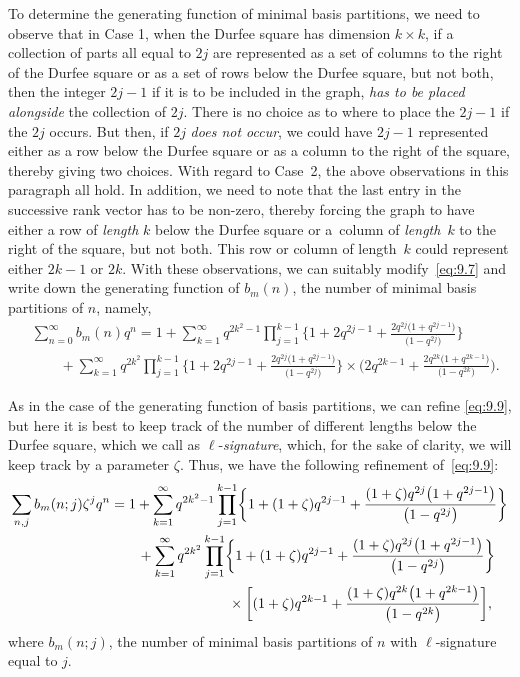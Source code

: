 \documentclass[pdftex]{sigma}
\numberwithin{equation}{section}
\theoremstyle{definition}
\begin{document}
To determine the generating function of minimal basis partitions, we need
to observe that in Case 1, when the Durfee square has dimension $k\times k$, if a collection
of parts all equal to $2j$ are represented as a set of columns to the
right of the Durfee square or as a set of rows below the Durfee square,
but not both, then the integer $2j-1$ if it is to be included in the graph,
\textit{has to be placed alongside} the collection of $2j$. There is no choice as to
where to place the $2j-1$ if the $2j$ occurs. But then, if $2j$ \textit{does not occur},
we could have $2j-1$ represented either as a row below the Durfee square or
as a column to the right of the square, thereby giving two choices. With
regard to Case~2, the above observations in this paragraph all hold. In
addition, we need to note that the last entry in the successive rank vector
has to be non-zero, thereby forcing the graph to have either a row of
{\it length} $k$ below the Durfee square or a~column of {\it length}~$k$
to the right of the square, but not both. This row or column of length~$k$
could represent either $2k-1$ or $2k$. With these observations, we can
suitably modify~\eqref{eq:9.7} and write down the generating function of $b_m(n)$,
the number of minimal basis partitions of $n$, namely,
\begin{align}
&\sum^{\infty}_{n=0}b_m(n)q^n=1+ \sum^{\infty}_{k=1}q^{2k^2-1}\prod^{k-1}_{j=1}
\biggl\{1+2q^{2j-1}+\frac{2q^{2j}\bigl(1+q^{2j-1}\bigr)}{\bigl(1-q^{2j}\bigr)}\biggr\}
\nonumber\\
&\qquad{}+ \sum^{\infty}_{k=1}q^{2k^2}\prod^{k-1}_{j=1}
\biggl\{1+2q^{2j-1}+\frac{2q^{2j}\bigl(1+q^{2j-1}\bigr)}{\bigl(1-q^{2j}\bigr)}\biggr\}
\times
\biggl(2q^{2k-1}+\frac{2q^{2k}\bigl(1+q^{2k-1}\bigr)}{\bigl(1-q^{2k}\bigr)}\biggr).\label{eq:9.9}
\end{align}

As in the case of the generating function of basis partitions, we can refine
\eqref{eq:9.9}, but here it is best to keep track of the number of different lengths
below the Durfee square, which we call as $\ell$-{\it signature}, which,
for the sake of clarity, we will keep track by a parameter $\zeta$. Thus, we
have the following refinement of~\eqref{eq:9.9}:
\begin{gather}
\sum_{n,j}b_m(n;j){\zeta}^jq^n=1+ \sum^{\infty}_{k=1}q^{2k^2-1}\prod^{k-1}_{j=1}
\biggl\{1+(1+\zeta)q^{2j-1}+\frac{(1+\zeta)q^{2j}\bigl(1+q^{2j-1}\bigr)}{\bigl(1-q^{2j}\bigr)}\biggr\}
\nonumber\\
\hphantom{\sum_{n,j}b_m(n;j){\zeta}^jq^n=}{}
+\sum^{\infty}_{k=1}q^{2k^2}\prod^{k-1}_{j=1}
\biggl\{1+(1+\zeta)q^{2j-1}+\frac{(1+\zeta)q^{2j}\bigl(1+q^{2j-1}\bigr)}{\bigl(1-q^{2j}\bigr)}\biggr\}\nonumber\\
\hphantom{\sum_{n,j}b_m(n;j){\zeta}^jq^n=+\sum^{\infty}_{k=1}q^{2k^2}\prod^{k-1}_{j=1}}{}
\times
\biggl[(1+\zeta)q^{2k-1}+\frac{(1+\zeta)q^{2k}\bigl(1+q^{2k-1}\bigr)}{\bigl(1-q^{2k}\bigr)}\biggr],\label{eq:9.10}
\end{gather}
where $b_m(n;j)$, the number of minimal basis partitions
of $n$ with $\ell$-signature equal to $j$.
\end{document}
